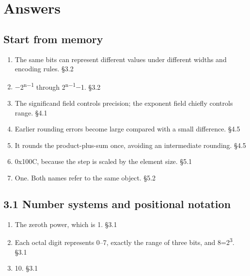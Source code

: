 \documentclass[11pt]{article}
\begin{document}
\clearpage
\section{Answers}
\begin{keepsection}\subsection{Start from memory}

\begin{enumerate}
\item The same bits can represent different values under different widths and encoding rules. \hfill{\small\color{FAUblue}§3.2}
\item \ensuremath{-}2\textsuperscript{n\ensuremath{-}1} through 2\textsuperscript{n\ensuremath{-}1}\ensuremath{-}1. \hfill{\small\color{FAUblue}§3.2}
\item The significand field controls precision; the exponent field chiefly controls range. \hfill{\small\color{FAUblue}§4.1}
\item Earlier rounding errors become large compared with a small difference. \hfill{\small\color{FAUblue}§4.5}
\item It rounds the product-plus-sum once, avoiding an intermediate rounding. \hfill{\small\color{FAUblue}§4.5}
\item 0x100C, because the step is scaled by the element size. \hfill{\small\color{FAUblue}§5.1}
\item One. Both names refer to the same object. \hfill{\small\color{FAUblue}§5.2}
\end{enumerate}

\end{keepsection}
\begin{keepsection}\subsection{3.1 Number systems and positional notation}

\begin{enumerate}
\item The zeroth power, which is 1. \hfill{\small\color{FAUblue}§3.1}
\item Each octal digit represents 0–7, exactly the range of three bits, and 8=2\textsuperscript{3}. \hfill{\small\color{FAUblue}§3.1}
\item 10. \hfill{\small\color{FAUblue}§3.1}
\end{enumerate}

\end{keepsection}
\end{document}
